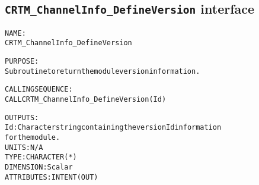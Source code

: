 \subsection{\texttt{CRTM\_ChannelInfo\_DefineVersion} interface}
  \label{sec:CRTM_ChannelInfo_DefineVersion_interface}
  \begin{alltt}
 
  NAME:
        CRTM_ChannelInfo_DefineVersion
 
  PURPOSE:
        Subroutine to return the module version information.
 
  CALLING SEQUENCE:
        CALL CRTM_ChannelInfo_DefineVersion( Id )
 
  OUTPUTS:
        Id:    Character string containing the version Id information
               for the module.
               UNITS:      N/A
               TYPE:       CHARACTER(*)
               DIMENSION:  Scalar
               ATTRIBUTES: INTENT(OUT)
 
  \end{alltt}
